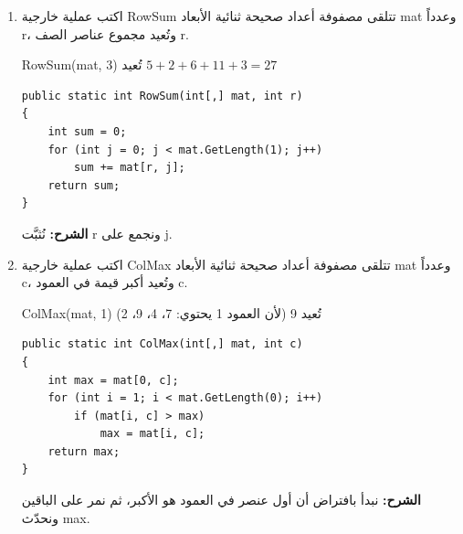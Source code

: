 \documentclass[14pt]{extarticle}
\begin{document}
\begin{enumerate}[itemsep=2em]
\item
اكتب عملية خارجية \textenglish{RowSum} تتلقى مصفوفة أعداد صحيحة ثنائية الأبعاد \textenglish{mat} وعدداً \textenglish{r}، وتُعيد مجموع عناصر الصف \textenglish{r}.

\begin{boxExample}
\textenglish{RowSum(mat, 3)} تُعيد $5+2+6+11+3 = 27$
\end{boxExample}

\ifwithsols
\begin{boxSolution}
\begin{boxCode}
\begin{english}
\begin{verbatim}
public static int RowSum(int[,] mat, int r)
{
    int sum = 0;
    for (int j = 0; j < mat.GetLength(1); j++)
        sum += mat[r, j];
    return sum;
}
\end{verbatim}
\end{english}
\end{boxCode}
\textbf{الشرح:} نُثبَّت \textenglish{r} ونجمع على \textenglish{j}.
\end{boxSolution}
\clearpage
\fi

\item
اكتب عملية خارجية \textenglish{ColMax} تتلقى مصفوفة أعداد صحيحة ثنائية الأبعاد \textenglish{mat} وعدداً \textenglish{c}، وتُعيد أكبر قيمة في العمود \textenglish{c}.

\begin{boxExample}
\textenglish{ColMax(mat, 1)} تُعيد \textenglish{9} (لأن العمود 1 يحتوي: 7، 4، 9، 2)
\end{boxExample}

\ifwithsols
\begin{boxSolution}
\begin{boxCode}
\begin{english}
\begin{verbatim}
public static int ColMax(int[,] mat, int c)
{
    int max = mat[0, c];
    for (int i = 1; i < mat.GetLength(0); i++)
        if (mat[i, c] > max)
            max = mat[i, c];
    return max;
}
\end{verbatim}
\end{english}
\end{boxCode}
\textbf{الشرح:} نبدأ بافتراض أن أول عنصر في العمود هو الأكبر، ثم نمر على الباقين ونحدّث \textenglish{max}.
\end{boxSolution}
\clearpage
\fi


\end{enumerate}
\end{document}

